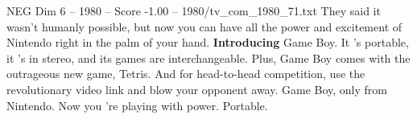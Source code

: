 \begin{textsample}{NEG Dim 6 – 1980 – Score -1.00 – 1980/tv\_com\_1980\_71.txt}  \label{ex:f6_neg_038}
They said it wasn't humanly possible, but now you can have all the power and excitement of Nintendo right in the palm of your hand. \textbf{Introducing} Game Boy.
It 's portable, it 's in stereo, and its games are interchangeable.
Plus, Game Boy comes with the outrageous new game, Tetris.
And for head-to-head competition, use the revolutionary video link and blow your opponent away.
Game Boy, only from Nintendo.
Now you 're playing with power.
Portable.

\end{textsample}
